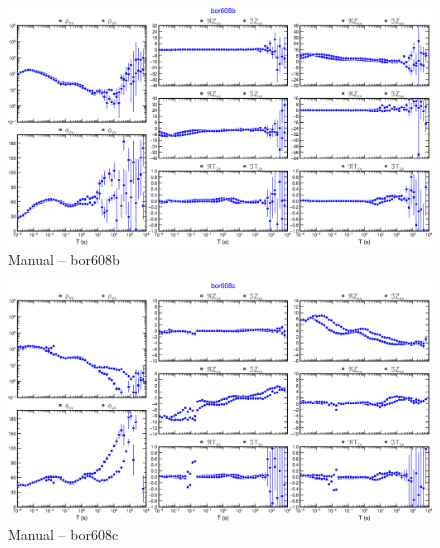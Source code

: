     \begin{figure}[H]
        \caption{Manual -- bor608b}
            \begin{center}
                \includegraphics[width=16cm]{texto/figura/sites/M-bor608b.png}
            \end{center}
    \end{figure}
    
    \begin{figure}[H]
        \caption{Manual -- bor608c}
            \begin{center}
                \includegraphics[width=16cm]{texto/figura/sites/M-bor608c.png}
            \end{center}
    \end{figure}
    
